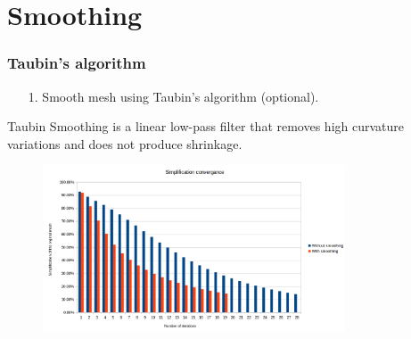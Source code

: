 \documentclass[
	10pt,
	t		%
]{beamer}
\begin{document}
\section{Smoothing}
\begin{frame}
\frametitle{Taubin's algorithm}
\centering
\begin{enumerate}
\item [1.] Smooth mesh using Taubin's algorithm (optional).
\end{enumerate}
Taubin Smoothing is a linear low-pass filter that removes high curvature variations and does not produce shrinkage.
\begin{figure}[ht]
\centering
\includegraphics[width=0.8\textwidth]{convergance}
\end{figure}
\end{frame}
\end{document}
